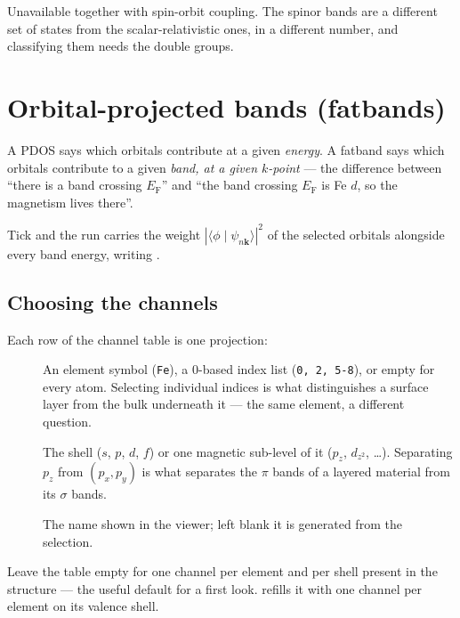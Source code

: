\begin{calnote}
Unavailable together with spin-orbit coupling. The spinor bands are a
different set of states from the scalar-relativistic ones, in a different
number, and classifying them needs the double groups.
\end{calnote}

\section{Orbital-projected bands (fatbands)}
\label{sec:fatbands}

A PDOS says which orbitals contribute at a given \emph{energy}. A fatband says
which orbitals contribute to a given \emph{band, at a given $k$-point} --- the
difference between ``there is a band crossing $E_\text{F}$'' and ``the band
crossing $E_\text{F}$ is Fe $d$, so the magnetism lives there''.

Tick  and the run carries the
weight $|\langle \phi \mid \psi_{n\mathbf{k}}\rangle|^2$ of the selected
orbitals alongside every band energy, writing .

\subsection{Choosing the channels}

Each row of the channel table is one projection:

\begin{description}
  \item[] An element symbol (\texttt{Fe}), a 0-based index list
    (\texttt{0, 2, 5-8}), or empty for every atom. Selecting individual
    indices is what distinguishes a surface layer from the bulk underneath it
    --- the same element, a different question.
  \item[] The shell ($s$, $p$, $d$, $f$) or one magnetic
    sub-level of it ($p_z$, $d_{z^2}$, \ldots). Separating $p_z$ from
    $(p_x, p_y)$ is what separates the $\pi$ bands of a layered material from
    its $\sigma$ bands.
  \item[] The name shown in the viewer; left blank it is generated
    from the selection.
\end{description}

Leave the table empty for one channel per element and per shell present in the
structure --- the useful default for a first look.  refills
it with one channel per element on its valence shell.

